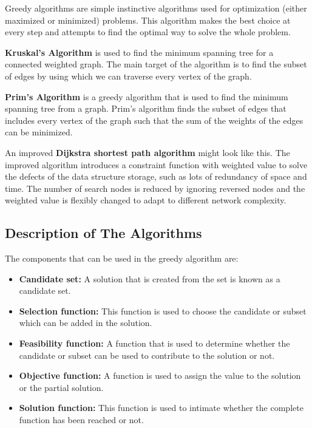\documentclass[a4paper, 12pt]{article}
\begin{document}
Greedy algorithms are simple instinctive algorithms used for optimization (either maximized or minimized) problems. This algorithm makes the best choice at every step and attempts to find the optimal way to solve the whole problem.

\textbf{Kruskal's Algorithm} is used to find the minimum spanning tree for a connected weighted graph. The main target of the algorithm is to find the subset of edges by using which we can traverse every vertex of the graph.

\textbf{Prim's Algorithm} is a greedy algorithm that is used to find the minimum spanning tree from a graph. Prim's algorithm finds the subset of edges that includes every vertex of the graph such that the sum of the weights of the edges can be minimized.

An improved \textbf{Dijkstra shortest path algorithm} might look like this. The improved algorithm introduces a
constraint function with weighted value to solve the defects of
the data structure storage, such as lots of redundancy of space
and time. The number of search nodes is reduced by ignoring
reversed nodes and the weighted value is flexibly changed to
adapt to different network complexity.

\newpage

\subsection{Description of The Algorithms}

The components that can be used in the greedy algorithm are:

\begin{itemize}
      \item \textbf{Candidate set:} A solution that is created from the set is known as a candidate set.
      \item \textbf{Selection function:} This function is used to choose the candidate or subset which can be added in the solution.
      \item \textbf{Feasibility function:} A function that is used to determine whether the candidate or subset can be used to contribute to the solution or not.
      \item \textbf{Objective function:} A function is used to assign the value to the solution or the partial solution.
      \item \textbf{Solution function:} This function is used to intimate whether the complete function has been reached or not.
\end{itemize}
\end{document}
